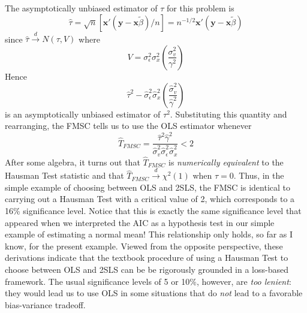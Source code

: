 The asymptotically unbiased estimator of $\tau$ for this problem is 
  $$\widehat{\tau} = \sqrt{n} \left[\mathbf{x}'(\mathbf{y} - \mathbf{x}\widetilde{\beta})/n\right] = n^{-1/2}\mathbf{x}'(\mathbf{y} - \mathbf{x}\widetilde{\beta})$$ 
since $\widehat{\tau} \overset{d}{\rightarrow} N(\tau, V)$ where
    $$V = \sigma^2_\epsilon \sigma^2_x \left( \frac{\sigma^2_v}{\gamma^2}\right)$$
Hence
	$$\widehat{\tau}^2 - \widehat{\sigma}_\epsilon^2\widehat{\sigma}_x^2 \left(\frac{\widehat{\sigma}_v^2}{\widehat{\gamma}^2}\right)$$
is an asymptotically unbiased estimator of $\tau^2$. Substituting this quantity and rearranging, the FMSC tells us to use the OLS estimator whenever
	$$\widehat{T}_{FMSC} = \frac{\widehat{\tau}^2 \widehat{\gamma}^2}{\widehat{\sigma}_v^2 \widehat{\sigma}_\epsilon^2 \widehat{\sigma}_x^2} < 2$$
After some algebra, it turns out that $\widehat{T}_{FMSC}$ is \emph{numerically equivalent} to the Hausman Test statistic and that $\widehat{T}_{FMSC} \overset{d}{\rightarrow} \chi^2(1)$ when $\tau = 0$. Thus, in the simple example of choosing between OLS and 2SLS, the FMSC is identical to carrying out a Hausman Test with a critical value of 2, which corresponds to a 16\% significance level. Notice that this is exactly the same significance level that appeared when we interpreted the AIC as a hypothesis test in our simple example of estimating a normal mean! This relationship only holds, so far as I know, for the present example. Viewed from the opposite perspective, these derivations indicate that the textbook procedure of using a Hausman Test to choose between OLS and 2SLS can be be rigorously grounded in a loss-based framework. The usual significance levels of 5 or 10\%, however, are \emph{too lenient}: they would lead us to use OLS in some situations that do \emph{not} lead to a favorable bias-variance tradeoff. 

